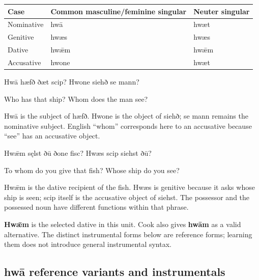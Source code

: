 \par\begingroup
\fontsize{10.5}{13.2}\selectfont
\setlength{\LTleft}{0pt}\setlength{\LTright}{\fill}
\noindent
\begin{tabular}{@{}>{\raggedright\arraybackslash}p{25.54mm}>{\raggedright\arraybackslash}p{64.36mm}>{\raggedright\arraybackslash}p{28.48mm}@{}}
\toprule
\textbf{Case} & \textbf{Common masculine/\allowbreak{}feminine singular} & \textbf{Neuter singular} \\
\midrule
Nominative & hwā & hwæt \\
Genitive & hwæs & hwæs \\
Dative & hwǣm & hwǣm \\
Accusative & hwone & hwæt \\
\bottomrule
\end{tabular}
\par\endgroup

Hwā hæfð ðæt scip? Hwone siehð se mann?

Who has that ship? Whom does the man see?

Hwā is the subject of hæfð. Hwone is the object of siehð; se mann remains the nominative subject. English “whom” corresponds here to an accusative because “see” has an accusative object.

Hwǣm sęlst ðū ðone fisc? Hwæs scip siehst ðū?

To whom do you give that fish? Whose ship do you see?

Hwǣm is the dative recipient of the fish. Hwæs is genitive because it asks whose ship is seen; scip itself is the accusative object of siehst. The possessor and the possessed noun have different functions within that phrase.

\textbf{Hwǣm} is the selected dative in this unit. Cook also gives \textbf{hwām} as a valid alternative. The distinct instrumental forms below are reference forms; learning them does not introduce general instrumental syntax.

\subsection*{hwā reference variants and instrumentals}

